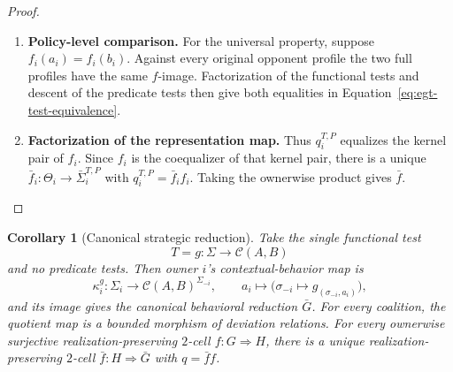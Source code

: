 \documentclass[11pt,a4paper]{article}
\numberwithin{equation}{section}
\newtheorem{corollary}[theorem]{Corollary}
\theoremstyle{definition}
\theoremstyle{remark}
\theoremstyle{plain}
\begin{document}
\begin{proof}
\begin{enumerate}[label=\textup{(\arabic*)},leftmargin=*,itemsep=4pt,topsep=3pt]
the same reduced contextual predicate behavior are equal. No representatives
of the reduced policies are selected in this argument.
  \item \textbf{Policy-level comparison.} For the universal property, suppose $f_i(a_i)=f_i(b_i)$. Against every
original opponent profile the two full profiles have the same $f$-image. Factorization of the functional tests and descent of the predicate tests then
give both equalities in Equation~\eqref{eq:egt-test-equivalence}.
  \item \textbf{Factorization of the representation map.} Thus
$q_i^{T,P}$ equalizes the kernel pair of $f_i$. Since $f_i$ is the
coequalizer of that kernel pair, there is a unique
$\bar f_i:\Theta_i\to\bar\Sigma_i^{T,P}$ with
$q_i^{T,P}=\bar f_i f_i$. Taking the ownerwise product gives $\bar f$.
\end{enumerate}
\end{proof}


\begin{corollary}[Canonical strategic reduction]
\label{thm:egt-strategic-quotient}
Take the single functional test
\[
 T=g:\Sigma\longrightarrow\mathcal C(A,B)
\]
and no predicate tests. Then owner $i$'s contextual-behavior map is
\[
 \kappa_i^g:\Sigma_i\longrightarrow
 \mathcal C(A,B)^{\Sigma_{-i}},
 \qquad
 a_i\longmapsto
 \bigl(\sigma_{-i}\mapsto g_{(\sigma_{-i},a_i)}\bigr),
\]
and its image gives the canonical behavioral reduction $\bar G$. For every coalition, the quotient map is a bounded morphism of deviation
relations. For every ownerwise surjective realization-preserving $2$-cell
$f:G\Rightarrow H$, there is a unique realization-preserving $2$-cell
$\bar f:H\Rightarrow\bar G$ with $q=\bar f f$.
\end{corollary}
\end{document}

